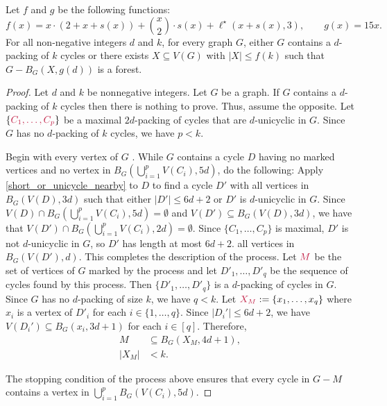 \documentclass{patmorin}
\DeclarePairedDelimiter\set{\{}{\}}
\begin{document}
\begin{thm}\label{thm:the-big-ball-of-wax}
  Let $f$ and $g$ be the following functions:
  \[
    \textstyle f(x)=
  x\cdot (2+x+s(x)) + \binom{x}{2}\cdot s(x) + \ell^\star(x+s(x),3), \qquad
    g(x)= 15x.
  \]
  For all non-negative integers $d$ and $k$, for every graph $G$, either $G$ contains a $d$-packing of $k$ cycles or there exists $X\subseteq V(G)$ with $|X|\leq f(k)$ such that $G-B_G(X,g(d))$ is a forest.
\end{thm}

\begin{proof}
  Let $d$ and $k$ be nonnegative integers. Let $G$ be a graph. If $G$ contains a $d$-packing of $k$ cycles then there is nothing to prove. Thus, assume the opposite. Let $\set{\mathdefin{C_1,\ldots,C_p}}$ be a maximal $2d$-packing of cycles that are $d$-unicyclic in $G$.  Since $G$ has no $d$-packing of $k$ cycles, we have $p<k$.

  Begin with every vertex of $G$ .  While $G$ contains a cycle $D$ having no marked vertices and no vertex in $B_G(\bigcup_{i=1}^p V(C_i),5d)$, do the following:  Apply \cref{short_or_unicycle_nearby} to $D$ to find a cycle $D'$ with all vertices in  $B_G(V(D),3d)$ such that either $|D'|\leq 6d+2$ or $D'$ is $d$-unicyclic in $G$. Since $V(D)\cap B_G(\bigcup_{i=1}^p V(C_i),5d)=\emptyset$ and $V(D')\subseteq B_G(V(D),3d)$, we have that $V(D')\cap B_G(\bigcup_{i=1}^p V(C_i),2d)=\emptyset$. Since $\{C_1,\ldots,C_p\}$ is maximal, $D'$ is not $d$-unicyclic in $G$, so $D'$ has length at most $6d+2$.   all vertices in $B_G(V(D'),d)$. This completes the description of the process.  Let $\mathdefin{M}$ be the set of vertices of $G$ marked by the process and let $D'_1,\ldots,D'_{q}$ be the sequence of cycles found by this process. Then $\{D'_1,\ldots,D'_q\}$ is a $d$-packing of cycles in $G$.  Since $G$ has no $d$-packing of size $k$, we have $q<k$. 
  Let $\mathdefin{X_M}:=\{x_1,\ldots,x_{q}\}$ where  $x_i$ is a vertex of $D'_i$ for each $i\in\{1,\ldots,q\}$. 
  Since $|D_i'|\leq 6d+2$, we have $V(D_i')\subseteq B_G(x_i,3d+1)$ for each $i\in[q]$. 
  Therefore, 
\begin{align}
  M&\subseteq B_G(X_M,4d+1),\label{eq:M-contained-in-a-ball}\\
  |X_M|&< k.\label{eq:XM-size}
\end{align}

The stopping condition of the process above ensures that 
every cycle in $G-M$ contains a vertex in $\bigcup_{i=1}^p B_G(V(C_i),5d)$.


\end{proof}
\end{document}
